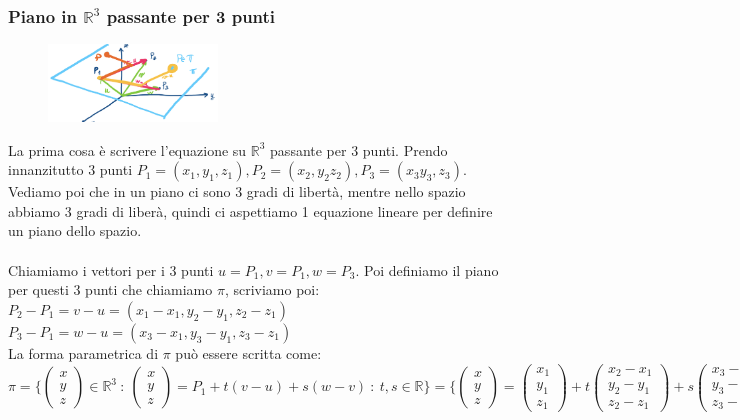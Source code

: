 \vspace{20pt}
\subsubsection{Piano in $\mathbb{R}^3$ passante per 3 punti}
\begin{figure}
    \vspace{-10pt}
    \centering
    \includegraphics[width=4.5cm]{images/retta-passante-3-punti-R3.png}
\end{figure}
La prima cosa è scrivere l'equazione su $\mathbb{R}^3$ passante per 3 punti. Prendo innanzitutto 3 punti $P_1 = (x_1, y_1, z_1), P_2 = (x_2, y_2 z_2), P_3 = (x_3 y_3, z_3)$. Vediamo poi che in un piano ci sono 3 gradi di libertà, mentre nello spazio abbiamo 3 gradi di liberà, quindi ci aspettiamo 1 equazione lineare per definire un piano dello spazio. \\\\
Chiamiamo i vettori per i 3 punti $u = P_1, v = P_1, w = P_3$. Poi definiamo il piano per questi 3 punti che chiamiamo $\pi$, scriviamo poi:\\ $P_2 - P_1 = v-u = (x_1 - x_1, y_2 - y_1, z_2 - z_1)$ \hspace{.3cm} $P_3 - P_1 = w- u = (x_3 - x_1, y_3 - y_1, z_3 - z_1)$\\
La forma parametrica di $\pi$ può essere scritta come:
\[\pi = \Bigg\{\begin{pmatrix}x\\y\\z\end{pmatrix}\in \mathbb{R}^3 \::\: \begin{pmatrix}x\\y\\z\end{pmatrix} = P_1+t(v-u)+s(w-v) \::\: t,s \in \mathbb{R}\Bigg\} = \Bigg\{\begin{pmatrix}x\\y\\z\end{pmatrix} = \begin{pmatrix}x_1\\y_1\\z_1\end{pmatrix} + t\begin{pmatrix}x_2-x_1\\y_2-y_1\\z_2-z_1\end{pmatrix}+s\begin{pmatrix}x_3 - x_1\\y_3 -y_1\\z_3 - z_1\end{pmatrix}\Bigg\}\]
